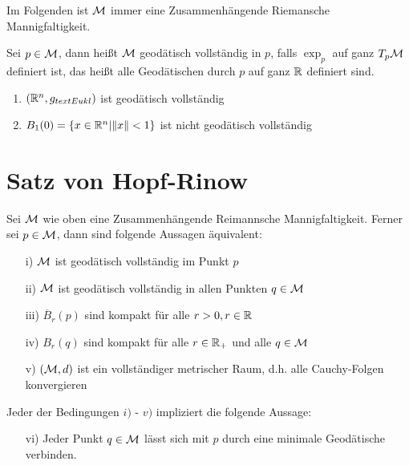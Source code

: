 
Im Folgenden ist $\mathcal{M}$ immer eine Zusammenhängende Riemansche Mannigfaltigkeit.

\begin{defs}
    Sei $p \in \mathcal{M}$, dann heißt $\mathcal{M}$ geodätisch vollständig in $p$, falls $\exp_p$ auf ganz $T_p \mathcal{M}$ definiert ist,
    das heißt alle Geodätischen durch $p$ auf ganz $\mathbb{R}$ definiert sind.
\end{defs}

\begin{bsp}
    \label{bsp:geodvollstaendig}
    \begin{enumerate}
        \item $(\mathbb{R}^n, g_{text{Eukl}})$ ist geodätisch vollständig
        \item $B_1 (0) = \{ x \in \mathbb{R}^n \vert \norm{x} < 1 \}$ ist nicht geodätisch vollständig
    \end{enumerate}
\end{bsp}

\section{Satz von Hopf-Rinow}

\begin{satz}
    \label{satz:hopfrinow}   
    Sei $\mathcal{M}$ wie oben eine Zusammenhängende Reimannsche Mannigfaltigkeit. 
    Ferner sei $p \in \mathcal{M}$, dann sind folgende Aussagen äquivalent:
    \begin{itemize}
    \item[i)] $\mathcal{M}$ ist geodätisch vollständig im Punkt $p$
    \item[ii)] $\mathcal{M}$ ist geodätisch vollständig in allen Punkten $q \in \mathcal{M}$
    \item[iii)] $\overline{B}_r (p)$ sind kompakt für alle $r > 0, r \in \mathbb{R}$
    \item[iv)] $B_r (q)$  sind kompakt für alle $r \in \mathbb{R}_+$ und alle $ q \in \mathcal{M}$
    \item[v)] $(\mathcal{M}, d)$ ist ein vollständiger metrischer Raum, d.h. alle Cauchy-Folgen konvergieren
    \end{itemize}
    Jeder der Bedingungen $i)$ - $v)$ impliziert die folgende Aussage:
    \begin{itemize}
    \item[vi)] Jeder Punkt $q \in \mathcal{M}$ lässt sich mit $p$ durch eine minimale Geodätische verbinden.
    \end{itemize}
\end{satz}

